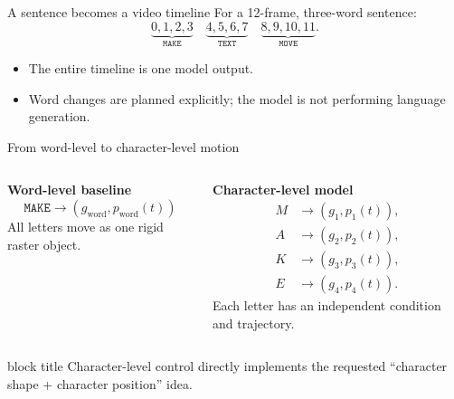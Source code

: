 \documentclass[aspectratio=169,xcolor=svgnames]{beamer}
\newcommand{\keypoint}[1]{%
\begin{center}
\begin{beamercolorbox}[rounded=true,shadow=true,wd=0.88\textwidth,sep=0.6em,center]{block title}
#1
\end{beamercolorbox}
\end{center}
}
\begin{document}
\begin{frame}{A sentence becomes a video timeline}
For a 12-frame, three-word sentence:
\[
\underbrace{0,1,2,3}_{\texttt{MAKE}}
\quad
\underbrace{4,5,6,7}_{\texttt{TEXT}}
\quad
\underbrace{8,9,10,11}_{\texttt{MOVE}}.
\]

\begin{center}
\end{center}

\begin{itemize}
    \item The entire timeline is one model output.
    \item Word changes are planned explicitly; the model is not performing language generation.
\end{itemize}
\end{frame}

\begin{frame}{From word-level to character-level motion}
\begin{columns}[T]
\textbf{Word-level baseline}
\[
\texttt{MAKE}\to(g_{\text{word}},p_{\text{word}}(t))
\]
All letters move as one rigid raster object.

\textbf{Character-level model}
\[
\begin{aligned}
M&\to(g_1,p_1(t)),\\
A&\to(g_2,p_2(t)),\\
K&\to(g_3,p_3(t)),\\
E&\to(g_4,p_4(t)).
\end{aligned}
\]
Each letter has an independent condition and trajectory.
\end{columns}

\keypoint{Character-level control directly implements the requested ``character shape + character position'' idea.}
\end{frame}
\end{document}
